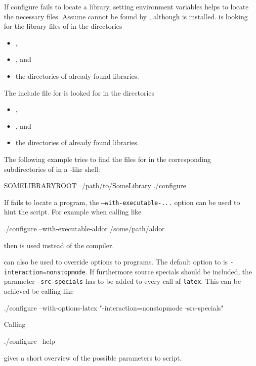 If configure fails to locate a library, setting environment variables helps  to locate the necessary files. Assume  cannot be found by , although  is installed.  is looking for the library files of  in the directories
\begin{itemize}
\item {},
\item {}, and
\item the directories of already found libraries.
\end{itemize}
The include file for  is looked for in the directories
\begin{itemize}
\item {},
\item {}, and
\item the directories of already found libraries.
\end{itemize}
The following example tries to find the files for  in the corresponding subdirectories of  in a \Bash-like shell:
\begin{console}
SOMELIBRARYROOT=/path/to/SomeLibrary ./configure
\end{console}

If  fails to locate a program, the {\tt --with-executable-...} option can be used to hint the  script. For example when calling  like
\begin{console}
./configure --with-executable-aldor /some/path/aldor
\end{console}
then  is used instead of the \Aldor compiler.

 can also be used to override options to programs. The default option to  is {\tt-interaction=nonstopmode}. If furthermore source specials should be included, the parameter {\tt-src-specials} has to be added to every call af {\tt latex}. This can be achieved be calling  like
\begin{console}
./configure --with-options-latex "-interaction=nonstopmode -src-specials"
\end{console}

Calling
\begin{console}
./configure --help
\end{console}
gives a short overview of the possible parameters to  script.
